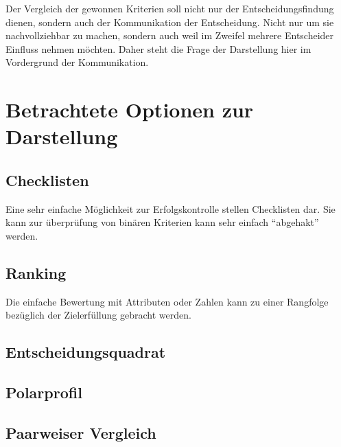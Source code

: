 

Der Vergleich der gewonnen Kriterien soll nicht nur der Entscheidungsfindung dienen, sondern auch der Kommunikation der Entscheidung.
Nicht nur um sie nachvollziehbar zu machen, sondern auch weil im Zweifel mehrere Entscheider Einfluss nehmen möchten.
Daher steht die Frage der Darstellung hier im Vordergrund der Kommunikation.



\section{Betrachtete Optionen zur Darstellung}

\subsection{Checklisten}

Eine sehr einfache Möglichkeit zur Erfolgskontrolle stellen Checklisten dar.
Sie kann zur überprüfung von binären Kriterien kann sehr einfach \enquote{abgehakt} werden.
 

\subsection{Ranking}

Die einfache Bewertung mit Attributen oder Zahlen kann zu einer Rangfolge bezüglich der Zielerfüllung gebracht werden.


\subsection{Entscheidungsquadrat}


\subsection{Polarprofil}

\subsection{Paarweiser Vergleich}

